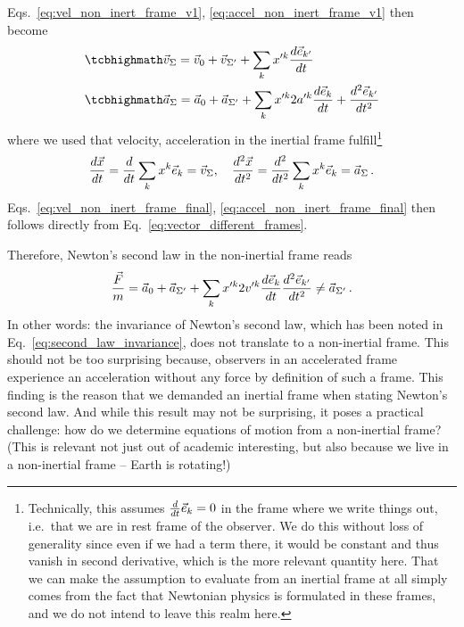 \documentclass[../class_mech_main.tex]{subfiles}
\begin{document}
Eqs.~\eqref{eq:vel_non_inert_frame_v1}, \eqref{eq:accel_non_inert_frame_v1} then become
\begin{align}
	&\eqbox{
		\vec{v}_\Sigma = \vec{v}_0 + \vec{v}_{\Sigma'} + \sum_k x'^k \dv{\unitvec{k'}}{t}
	}
	\label{eq:vel_non_inert_frame_final}
	\\
	&\eqbox{
		\vec{a}_\Sigma = \vec{a}_0 + \vec{a}_{\Sigma'} + \sum_k x'^k 2 a'^k \dv{\unitvec{k}}{t} + \dv[2]{\unitvec{k'}}{t}
	}
	\label{eq:accel_non_inert_frame_final}
\end{align}
where we used that velocity, acceleration in the inertial frame fulfill\footnote{Technically, this assumes $\dv{t} \vec{e}_k = 0$ in the frame where we write things out, i.e.~that we are in rest frame of the observer. We do this without loss of generality since even if we had a term there, it would be constant and thus vanish in second derivative, which is the more relevant quantity here. That we can make the assumption to evaluate from an inertial frame at all simply comes from the fact that Newtonian physics is formulated in these frames, and we do not intend to leave this realm here.}
\begin{equation}
	\dv{\vec{x}}{t} = \dv{t} \sum_k x^k \vec{e}_{k} = \vec{v}_\Sigma, \quad \dv[2]{\vec{x}}{t} = \dv[2]{t} \sum_k x^k \vec{e}_{k} = \vec{a}_\Sigma
	\, .
\end{equation}
Eqs.~\eqref{eq:vel_non_inert_frame_final}, \eqref{eq:accel_non_inert_frame_final} then follows directly from Eq.~\eqref{eq:vector_different_frames}.


Therefore, Newton's second law in the non-inertial frame reads
\begin{equation}\label{eq:second_law_non_inert_frame}
	\frac{\vec{F}}{m} = \vec{a}_0 + \vec{a}_{\Sigma'} + \sum_k x'^k 2 v'^k \dv{\vec{e}_{k}}{t} \dv[2]{\vec{e}_{k'}}{t} \neq \vec{a}_{\Sigma'}
	\, .
\end{equation}
In other words: the invariance of Newton's second law, which has been noted in Eq.~\eqref{eq:second_law_invariance}, does not translate to a non-inertial frame. This should not be too surprising because, observers in an accelerated frame experience an acceleration without any force by definition of such a frame. This finding is the reason that we demanded an inertial frame when stating Newton's second law. And while this result may not be surprising, it poses a practical challenge: how do we determine equations of motion from a non-inertial frame? (This is relevant not just out of academic interesting, but also because we live in a non-inertial frame -- Earth is rotating!)
\end{document}
